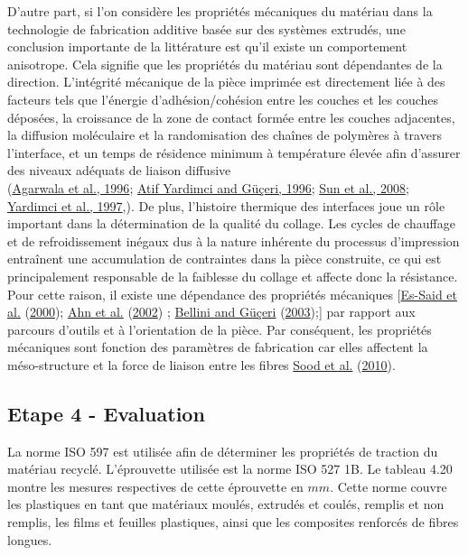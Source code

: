 \documentclass[
]{article}
\begin{document}
D'autre part, si l'on considère les propriétés mécaniques du matériau dans la technologie de fabrication additive basée sur des systèmes extrudés, une conclusion importante de la littérature est qu'il existe un comportement anisotrope.
Cela signifie que les propriétés du matériau sont dépendantes de la direction.
L'intégrité mécanique de la pièce imprimée est directement liée à des facteurs tels que l'énergie d'adhésion/cohésion entre les couches et les couches déposées, la croissance de la zone de contact formée entre les couches adjacentes, la diffusion moléculaire et la randomisation des chaînes de polymères à travers l'interface, et un temps de résidence minimum à température élevée afin d'assurer des niveaux adéquats de liaison diffusive\\
(\protect\hyperlink{ref-Agarwala1996}{Agarwala et al., 1996}; \protect\hyperlink{ref-AtifYardimci1996}{Atif Yardimci and Güçeri, 1996}; \protect\hyperlink{ref-Sun2008}{Sun et al., 2008}; \protect\hyperlink{ref-Yardimci1997}{Yardimci et al., 1997},).
De plus, l'histoire thermique des interfaces joue un rôle important dans la détermination de la qualité du collage. Les cycles de chauffage et de refroidissement inégaux dus à la nature inhérente du processus d'impression entraînent une accumulation de contraintes dans la pièce construite, ce qui est principalement responsable de la faiblesse du collage et affecte donc la résistance.
Pour cette raison, il existe une dépendance des propriétés mécaniques {[}\protect\hyperlink{ref-Es-Said2000}{Es-Said et al.} (\protect\hyperlink{ref-Es-Said2000}{2000}); \protect\hyperlink{ref-Ahn2002}{Ahn et al.} (\protect\hyperlink{ref-Ahn2002}{2002}) ; \protect\hyperlink{ref-Bellini2003}{Bellini and Güçeri} (\protect\hyperlink{ref-Bellini2003}{2003});{]} par rapport aux parcours d'outils et à l'orientation de la pièce. Par conséquent, les propriétés mécaniques sont fonction des paramètres de fabrication car elles affectent la méso-structure et la force de liaison entre les fibres \protect\hyperlink{ref-Sood2010}{Sood et al.} (\protect\hyperlink{ref-Sood2010}{2010}).

\hypertarget{etape-4---evaluation}{%
\subsection{Etape 4 - Evaluation}\label{etape-4---evaluation}}

La norme ISO 597 est utilisée afin de déterminer les propriétés de traction du matériau recyclé.
L'éprouvette utilisée est la norme ISO 527 1B.
Le tableau 4.20 montre les mesures respectives de cette éprouvette en \(mm\).
Cette norme couvre les plastiques en tant que matériaux moulés, extrudés et coulés, remplis et non remplis, les films et feuilles plastiques, ainsi que les composites renforcés de fibres longues.
\end{document}
